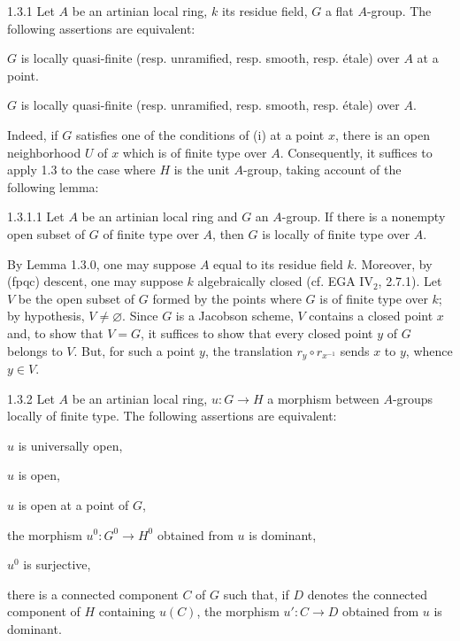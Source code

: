 \begin{corollary}{1.3.1}\label{VIB.1.3.1}
Let $A$ be an artinian local ring, $k$ its residue field, $G$ a flat $A$-group. The following assertions are equivalent:
\begin{enumeratei}
\item $G$ is locally quasi-finite (resp. unramified, resp. smooth, resp. étale) over $A$ at a point.
\item $G$ is locally quasi-finite (resp. unramified, resp. smooth, resp. étale) over $A$.
\end{enumeratei}
\end{corollary}
Indeed, if $G$ satisfies one of the conditions of (i) at a point $x$, there is an open neighborhood $U$ of $x$ which is of finite type over $A$. Consequently, it suffices to apply 1.3 to the case where $H$ is the unit $A$-group, taking account of the following lemma:
\begin{lemma}{1.3.1.1}\label{VIB.1.3.1.1}
Let $A$ be an artinian local ring and $G$ an $A$-group. If there is a nonempty open subset of $G$ of finite type over $A$, then $G$ is locally of finite type over $A$.
\end{lemma}
By Lemma 1.3.0, one may suppose $A$ equal to its residue field $k$. Moreover, by (fpqc) descent, one may suppose $k$ algebraically closed (cf. EGA IV$_2$, 2.7.1). Let $V$ be the open subset of $G$ formed by the points where $G$ is of finite type over $k$; by hypothesis, $V\ne\varnothing$. Since $G$ is a Jacobson scheme, $V$ contains a closed point $x$ and, to show that $V=G$, it suffices to show that every closed point $y$ of $G$ belongs to $V$. But, for such a point $y$, the translation $r_y\circ r_{x^{-1}}$ sends $x$ to $y$, whence $y\in V$.
\begin{corollary}{1.3.2}\label{VIB.1.3.2}
Let $A$ be an artinian local ring, $u:G\to H$ a morphism between $A$-groups locally of finite type. The following assertions are equivalent:
\begin{enumeratei}
\item $u$ is universally open,
\item $u$ is open,
\item $u$ is open at a point of $G$,
\item the morphism $u^0:G^0\to H^0$ obtained from $u$ is dominant,
\item[(iv$'$)] $u^0$ is surjective,
\item[(v)] there is a connected component $C$ of $G$ such that, if $D$ denotes the connected component of $H$ containing $u(C)$, the morphism $u':C\to D$ obtained from $u$ is dominant.
\end{enumeratei}
\end{corollary}
